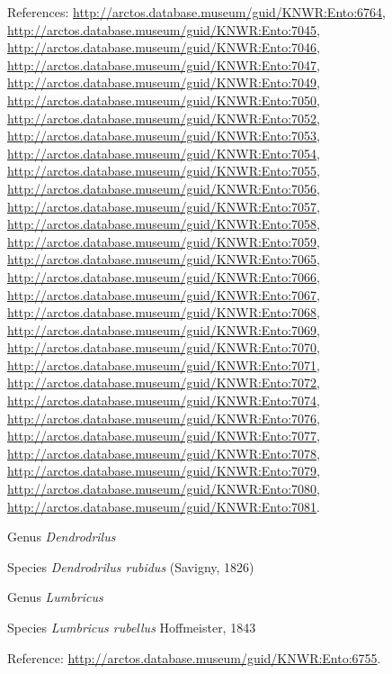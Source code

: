 \documentclass[9pt, article]{memoir}
\begin{document}
\begin{multicols}{2}
\vspace{6pt}References: 
\url{http://arctos.database.museum/guid/KNWR:Ento:6764}, 
\url{http://arctos.database.museum/guid/KNWR:Ento:7045}, 
\url{http://arctos.database.museum/guid/KNWR:Ento:7046}, 
\url{http://arctos.database.museum/guid/KNWR:Ento:7047}, 
\url{http://arctos.database.museum/guid/KNWR:Ento:7049}, 
\url{http://arctos.database.museum/guid/KNWR:Ento:7050}, 
\url{http://arctos.database.museum/guid/KNWR:Ento:7052}, 
\url{http://arctos.database.museum/guid/KNWR:Ento:7053}, 
\url{http://arctos.database.museum/guid/KNWR:Ento:7054}, 
\url{http://arctos.database.museum/guid/KNWR:Ento:7055}, 
\url{http://arctos.database.museum/guid/KNWR:Ento:7056}, 
\url{http://arctos.database.museum/guid/KNWR:Ento:7057}, 
\url{http://arctos.database.museum/guid/KNWR:Ento:7058}, 
\url{http://arctos.database.museum/guid/KNWR:Ento:7059}, 
\url{http://arctos.database.museum/guid/KNWR:Ento:7065}, 
\url{http://arctos.database.museum/guid/KNWR:Ento:7066}, 
\url{http://arctos.database.museum/guid/KNWR:Ento:7067}, 
\url{http://arctos.database.museum/guid/KNWR:Ento:7068}, 
\url{http://arctos.database.museum/guid/KNWR:Ento:7069}, 
\url{http://arctos.database.museum/guid/KNWR:Ento:7070}, 
\url{http://arctos.database.museum/guid/KNWR:Ento:7071}, 
\url{http://arctos.database.museum/guid/KNWR:Ento:7072}, 
\url{http://arctos.database.museum/guid/KNWR:Ento:7074}, 
\url{http://arctos.database.museum/guid/KNWR:Ento:7076}, 
\url{http://arctos.database.museum/guid/KNWR:Ento:7077}, 
\url{http://arctos.database.museum/guid/KNWR:Ento:7078}, 
\url{http://arctos.database.museum/guid/KNWR:Ento:7079}, 
\url{http://arctos.database.museum/guid/KNWR:Ento:7080}, 
\url{http://arctos.database.museum/guid/KNWR:Ento:7081}.

\vspace{6pt}\noindent\hspace{30pt}Genus \textit{Dendrodrilus}


\vspace{6pt}\noindent\hspace{36pt}Species \textit{Dendrodrilus rubidus} (Savigny, 1826)


\vspace{6pt}\noindent\hspace{30pt}Genus \textit{Lumbricus}


\vspace{6pt}\noindent\hspace{36pt}Species \textit{Lumbricus rubellus} Hoffmeister, 1843


\vspace{6pt}Reference: 
\url{http://arctos.database.museum/guid/KNWR:Ento:6755}.


\end{multicols}
\end{document}
